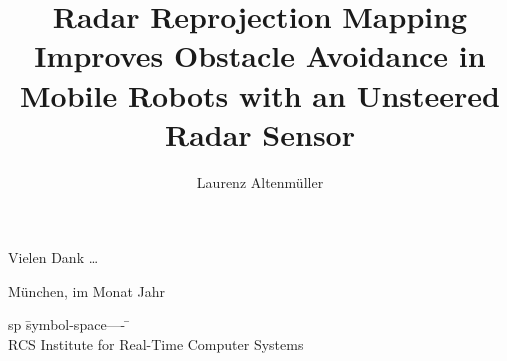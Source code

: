 \documentclass[%
	12pt,		%
	headinclude,	%
	a4paper,	%
	pointlessnumbers, %
	changebar,      %
	liststotoc,	%
	bibtotoc,
	idxtotoc,
	]{diplomarbeit}
\title{Radar Reprojection Mapping Improves Obstacle Avoidance in Mobile Robots with an Unsteered Radar Sensor}
\author{Laurenz Altenmüller}
\begin{document}
\renewcommand{\thepage}{t\arabic{page}}
\maketitle

 \pagestyle{empty}
\cleardoublepage 
\setcounter{page}{3}	%
\renewcommand{\thepage}{\roman{page}}
\begin{danksagung}
  Vielen Dank \dots

  München, im Monat Jahr
\end{danksagung}


\clearpage
\pagestyle{headings}
\tableofcontents

\listoffigures
\listoftables
\begin{listofsymbols}
\begin{tabbing}
sp	\= symbol-space---- \= \kill \+ \\

RCS	\> Institute for Real-Time Computer Systems \\

\end{tabbing}
\end{listofsymbols}
\end{document}

